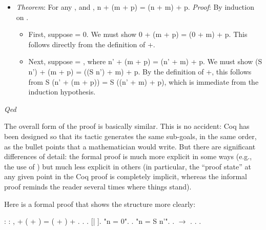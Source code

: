 \documentclass[12pt]{report}
\begin{document}
\begin{itemize}
\item  \textit{Theorem}: For any ,  and ,
      n + (m + p) = (n + m) + p.
    \textit{Proof}: By induction on .



\begin{itemize}
\item  First, suppose  = 0.  We must show 
        0 + (m + p) = (0 + m) + p.  
      This follows directly from the definition of +.



\item  Next, suppose  =  , where
        n' + (m + p) = (n' + m) + p.
      We must show
        (S n') + (m + p) = ((S n') + m) + p.
      By the definition of +, this follows from
        S (n' + (m + p)) = S ((n' + m) + p),
      which is immediate from the induction hypothesis. 
\end{itemize}

\end{itemize}
 \textit{Qed} 

 The overall form of the proof is basically similar.  This is
    no accident: Coq has been designed so that its  tactic
    generates the same sub-goals, in the same order, as the bullet
    points that a mathematician would write.  But there are
    significant differences of detail: the formal proof is much more
    explicit in some ways (e.g., the use of ) but much
    less explicit in others (in particular, the ``proof state'' at any
    given point in the Coq proof is completely implicit, whereas the
    informal proof reminds the reader several times where things
    stand). 

 Here is a formal proof that shows the structure more
    clearly: \begin{coqdoccode}
\coqdocemptyline
\coqdocnoindent
{}  : \coqdockw{\ensuremath{\forall}}    : ,\coqdoceol
\coqdocindent{1.00em}
 + ( + ) = ( + ) + .\coqdoceol
\coqdocnoindent
{}.\coqdoceol
\coqdocindent{1.00em}
   .    [| ].\coqdoceol
\coqdocindent{1.00em}
 "n = 0".\coqdoceol
\coqdocindent{2.00em}
.\coqdoceol
\coqdocindent{1.00em}
 "n = S n'".\coqdoceol
\coqdocindent{2.00em}
.  \ensuremath{\rightarrow} . . .\coqdoceol
\coqdocemptyline
\end{coqdoccode}
\end{document}
